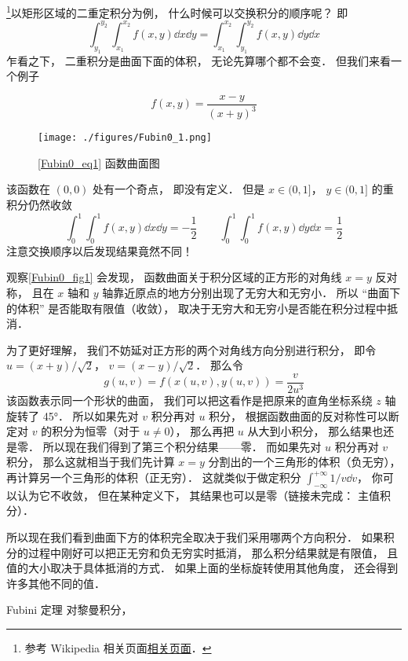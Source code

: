 

\footnote{参考 Wikipedia 相关页面\href{https://en.wikipedia.org/wiki/Fubini's_theorem}{相关页面}．}以矩形区域的二重定积分为例， 什么时候可以交换积分的顺序呢？ 即
\begin{equation}
\int_{y_1}^{y_2}\int_{x_1}^{x_2} f(x, y) \dd{x} \dd{y} = \int_{x_1}^{x_2}\int_{y_1}^{y_2} f(x, y) \dd{y}\dd{x}
\end{equation}
乍看之下， 二重积分是曲面下面的体积， 无论先算哪个都不会变． 但我们来看一个例子

\begin{example}{}
\begin{equation}\label{Fubin0_eq1}
f(x, y) = \frac{x - y}{(x+y)^3}
\end{equation}
\begin{figure}[ht]
\centering
\texttt{[image: ./figures/Fubin0\_1.png]}
\caption{\autoref{Fubin0_eq1} 函数曲面图} \label{Fubin0_fig1}
\end{figure}
该函数在 $(0,0)$ 处有一个奇点， 即没有定义． 但是 $x \in (0, 1]$， $y \in (0, 1]$ 的重积分仍然收敛
\begin{equation}
\int_0^1 \int_0^1 f(x,y) \dd{x} \dd{y} = -\frac{1}{2}
\qquad
\int_0^1 \int_0^1 f(x,y) \dd{y} \dd{x} = \frac{1}{2}
\end{equation}
注意交换顺序以后发现结果竟然不同！

观察\autoref{Fubin0_fig1} 会发现， 函数曲面关于积分区域的正方形的对角线 $x=y$ 反对称， 且在 $x$ 轴和 $y$ 轴靠近原点的地方分别出现了无穷大和无穷小． 所以 “曲面下的体积” 是否能取有限值（收敛）， 取决于无穷大和无穷小是否能在积分过程中抵消．

为了更好理解， 我们不妨延对正方形的两个对角线方向分别进行积分， 即令 $u = (x+y)/\sqrt{2}$， $v=(x-y)/\sqrt{2}$． 那么令
\begin{equation}
g(u,v) = f(x(u,v), y(u,v)) = \frac{v}{2u^3}
\end{equation}
该函数表示同一个形状的曲面， 我们可以把这看作是把原来的直角坐标系绕 $z$ 轴旋转了 45°． 所以如果先对 $v$ 积分再对 $u$ 积分， 根据函数曲面的反对称性可以断定对 $v$ 的积分为恒零（对于 $u\ne 0$）， 那么再把 $u$ 从大到小积分， 那么结果也还是零． 所以现在我们得到了第三个积分结果——零． 而如果先对 $u$ 积分再对 $v$ 积分， 那么这就相当于我们先计算 $x=y$ 分割出的一个三角形的体积（负无穷）， 再计算另一个三角形的体积（正无穷）． 这就类似于做定积分 $\int_{-\infty}^{+\infty}1/v\dd{v}$， 你可以认为它不收敛， 但在某种定义下， 其结果也可以是零（链接未完成： 主值积分）．

所以现在我们看到曲面下方的体积完全取决于我们采用哪两个方向积分． 如果积分的过程中刚好可以把正无穷和负无穷实时抵消， 那么积分结果就是有限值， 且值的大小取决于具体抵消的方式． 如果上面的坐标旋转使用其他角度， 还会得到许多其他不同的值．
\end{example}

\begin{theorem}{Fubini 定理}
对黎曼积分， 
\end{theorem}
